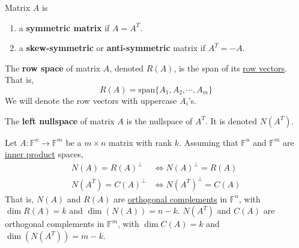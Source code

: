 	\begin{definition}
	  \label{def:symmetric-matrices}
    Matrix $A$ is 
		\begin{enumerate}
		  \item a \textbf{symmetric matrix} if $A = A^T$. 
			\item a \textbf{skew-symmetric} or \textbf{anti-symmetric} matrix if $A^T = - A$. 
		\end{enumerate}
  \end{definition}
	
  \begin{definition}
    \label{def:row-space}
    The \textbf{row space} of matrix $A$, denoted $R(A)$, is the span of its \hyperref[def:row-vector]{row vectors}. That is, 
    \begin{equation}
      R(A) = \text{span}\{ A_1, A_2, \cdots, A_m\}
    \end{equation}
    We will denote the row vectors with uppercase $A_i$'s. 
  \end{definition}

	\begin{definition}
	  \label{def:left-nullspace}
    The \textbf{left nullspace} of matrix $A$ is the nullspace of $A^T$. It is denoted $N(A^T)$. 
  \end{definition}

  \begin{theorem}
    \label{thm:four-fundamental-subspaces-of-a-matrix}
    Let $A: \mathbb{F}^n \to \mathbb{F}^m$ be a $m \times n$ matrix with rank $k$. Assuming that $\mathbb{F}^n$ and $\mathbb{F}^m$ are \hyperref[def:inner-product]{inner product} spaces,  
    \begin{align}
      N(A) = R(A)^\perp &\iff N(A)^\perp = R(A) \\
      N(A^T) = C(A)^\perp &\iff N(A^T)^\perp = C(A)
    \end{align}
    That is, $N(A)$ and $R(A)$ are \hyperref[def:orthogonal-complement]{orthogonal complements} in $\mathbb{F}^n$, with $\dim R(A) = k$ and $\dim(N(A)) = n - k$. $N(A^T)$ and $C(A)$ are orthogonal complements in $\mathbb{F}^m$, with $\dim C(A) = k$ and $\dim(N(A^T)) = m - k$. 
  \end{theorem}

